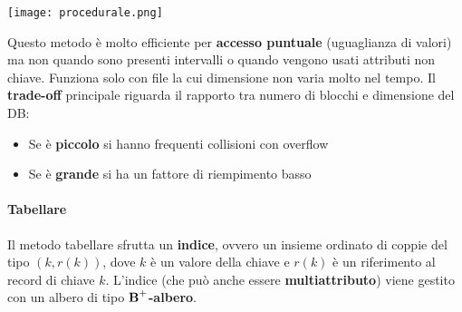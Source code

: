 \begin{center}
	\texttt{[image: procedurale.png]}
\end{center}

Questo metodo è molto efficiente per \textbf{accesso puntuale} (uguaglianza di valori) ma non quando sono presenti intervalli o quando vengono usati attributi non chiave. Funziona solo con file la cui dimensione non varia molto nel tempo. Il \textbf{trade-off} principale riguarda il rapporto tra numero di blocchi e dimensione del DB:
\begin{itemize}
	\item Se è \textbf{piccolo} si hanno frequenti collisioni con overflow
	\item Se è \textbf{grande} si ha un fattore di riempimento basso
\end{itemize}
\newpage
\paragraph{Tabellare}
Il metodo tabellare sfrutta un \textbf{indice}, ovvero un insieme ordinato di coppie del tipo $(k, r(k))$, dove $k$ è un valore della chiave e $r(k)$ è un riferimento al record di chiave $k$. L'indice (che può anche essere \textbf{multiattributo}) viene gestito con un albero di tipo $\text{\textbf{B}}^\mathbf{+}$\textbf{-albero}.

